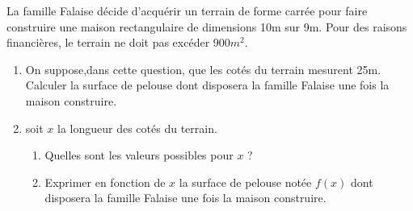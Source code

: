 
La famille Falaise décide d’acquérir un terrain de forme carrée pour faire construire une maison rectangulaire de dimensions
10m sur 9m. Pour des raisons financières, le terrain ne doit pas excéder $900m^2$.

\begin{enumerate}
\item On suppose,dans cette question, que les cotés du terrain mesurent 25m. Calculer la surface de pelouse dont disposera
la famille Falaise une fois la maison construire.
\item  soit $x$ la longueur des cotés du terrain.
\begin{enumerate}
	\item Quelles sont les valeurs possibles pour $x$ ?
	\item Exprimer en fonction de $x$ la surface de pelouse notée $f(x)$ dont disposera la famille Falaise une fois la maison construire.
\end{enumerate}
\end{enumerate}
